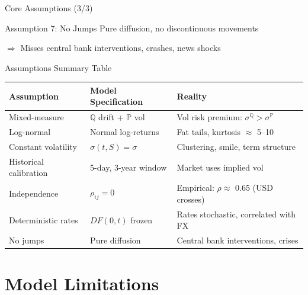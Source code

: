 \documentclass[11pt,aspectratio=169]{beamer}
\begin{document}
	\begin{frame}{Core Assumptions (3/3)}


		\begin{block}{Assumption 7: No Jumps}
			Pure diffusion, no discontinuous movements
			
			\textcolor{mufgred}{$\Rightarrow$ Misses central bank interventions, crashes, news shocks}
		\end{block}
	\end{frame}
	
	\begin{frame}{Assumptions Summary Table}
		\scriptsize
		\begin{table}
			\begin{tabular}{|p{3.5cm}|p{4cm}|p{3.5cm}|}
				\hline
				\textbf{Assumption} & \textbf{Model Specification} & \textbf{Reality} \\
				\hline
				Mixed-measure & $\mathbb{Q}$ drift + $\mathbb{P}$ vol & Vol risk premium: $\sigma^{\mathbb{Q}} > \sigma^{\mathbb{P}}$ \\
				\hline
				Log-normal & Normal log-returns & Fat tails, kurtosis $\approx$ 5--10 \\
				\hline
				Constant volatility & $\sigma(t,S) = \sigma$ & Clustering, smile, term structure \\
				\hline
				Historical calibration & 5-day, 3-year window & Market uses implied vol \\
				\hline
				Independence & $\rho_{ij} = 0$ & Empirical: $\rho \approx$ 0.65 (USD crosses) \\
				\hline
				Deterministic rates & $DF(0,t)$ frozen & Rates stochastic, correlated with FX \\
				\hline
				No jumps & Pure diffusion & Central bank interventions, crises \\
				\hline
			\end{tabular}
		\end{table}
	\end{frame}
	
	\section{Model Limitations}
	
\end{document}
